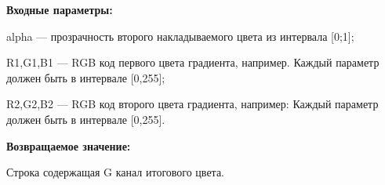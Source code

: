 \textbf{Входные параметры:}  

alpha --- прозрачность второго накладываемого цвета из интервала [0;1];
 
    R1,G1,B1 --- RGB код первого цвета градиента, например. Каждый параметр должен быть в интервале [0,255];
 
    R2,G2,B2 --- RGB код второго цвета градиента, например: Каждый параметр должен быть в интервале [0,255].

\textbf{Возвращаемое значение:}

Строка содержащая G канал итогового цвета.